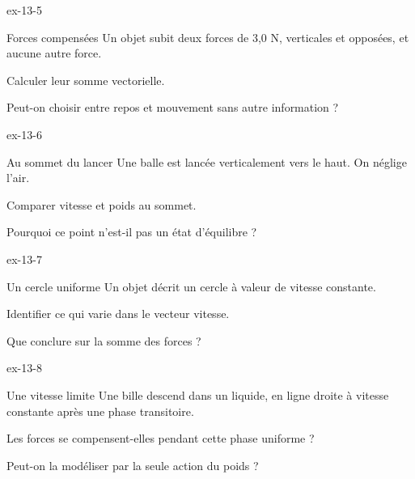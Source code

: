 \begin{blocLivre}{ex-13-5}\begin{exercice}[2]{Forces compensées}
Un objet subit deux forces de 3,0 N, verticales et opposées, et aucune autre force.
\begin{questions}
\item Calculer leur somme vectorielle.
\item Peut-on choisir entre repos et mouvement sans autre information ?
\end{questions}
\end{exercice}\end{blocLivre}
\begin{blocLivre}{ex-13-6}\begin{exercice}[2]{Au sommet du lancer}
Une balle est lancée verticalement vers le haut. On néglige l’air.
\begin{questions}
\item Comparer vitesse et poids au sommet.
\item Pourquoi ce point n’est-il pas un état d’équilibre ?
\end{questions}
\end{exercice}\end{blocLivre}
\begin{blocLivre}{ex-13-7}\begin{exercice}[2]{Un cercle uniforme}
Un objet décrit un cercle à valeur de vitesse constante.
\begin{questions}
\item Identifier ce qui varie dans le vecteur vitesse.
\item Que conclure sur la somme des forces ?
\end{questions}
\end{exercice}\end{blocLivre}
\begin{blocLivre}{ex-13-8}\begin{exercice}[2]{Une vitesse limite}
Une bille descend dans un liquide, en ligne droite à vitesse constante après une phase transitoire.
\begin{questions}
\item Les forces se compensent-elles pendant cette phase uniforme ?
\item Peut-on la modéliser par la seule action du poids ?
\end{questions}
\end{exercice}\end{blocLivre}
